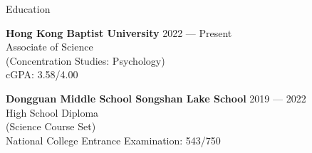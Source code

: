 \documentclass[
	11pt, %
]{resume} %
\begin{document}
\begin{rSection}{Education}

    \textbf{Hong Kong Baptist University} \hfill 2022 --- Present \\
    Associate of Science\\
    (Concentration Studies: Psychology)\\
    cGPA: 3.58/4.00

    \textbf{Dongguan Middle School Songshan Lake School} \hfill 2019 --- 2022 \\
    High School Diploma \\
    (Science Course Set)\\
    National College Entrance Examination: 543/750

\end{rSection}
\end{document}
